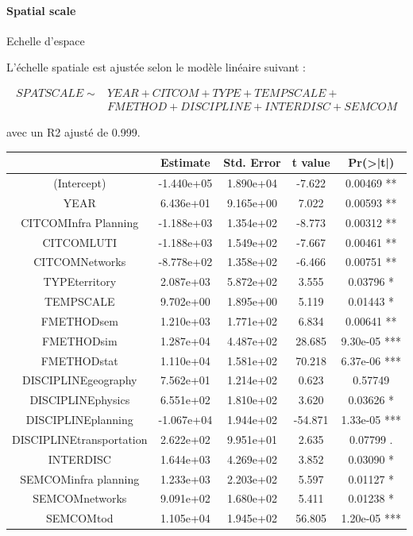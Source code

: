 \paragraph{Spatial scale}{Echelle d'espace}


L'échelle spatiale est ajustée selon le modèle linéaire suivant :

\[
\begin{split}
	SPATSCALE \sim & YEAR+CITCOM+TYPE+TEMPSCALE+ \\
	& FMETHOD+DISCIPLINE+INTERDISC+SEMCOM
\end{split}
\]

avec un R2 ajusté de 0.999.


{\centering
\begin{tabular}{|c|c|c|c|c|}
\hline
                      &     Estimate & Std. Error & t value & Pr(>|t|)    \\\hline
(Intercept)           &   -1.440e+05 & 1.890e+04 & -7.622 & 0.00469 ** \\
YEAR                   &   6.436e+01 & 9.165e+00 &  7.022 & 0.00593 ** \\
CITCOMInfra Planning   &  -1.188e+03 & 1.354e+02 & -8.773 & 0.00312 ** \\
CITCOMLUTI             &  -1.188e+03 & 1.549e+02 & -7.667 & 0.00461 ** \\
CITCOMNetworks         &  -8.778e+02 & 1.358e+02 & -6.466 & 0.00751 ** \\
TYPEterritory          &   2.087e+03 & 5.872e+02 &  3.555 & 0.03796 *  \\
TEMPSCALE              &   9.702e+00 & 1.895e+00 &  5.119 & 0.01443 *  \\
FMETHODsem             &   1.210e+03 & 1.771e+02 &  6.834 & 0.00641 ** \\
FMETHODsim             &   1.287e+04 & 4.487e+02 & 28.685 & 9.30e-05 *** \\
FMETHODstat            &   1.110e+04 & 1.581e+02 & 70.218 & 6.37e-06 ***\\
DISCIPLINEgeography    &   7.562e+01 & 1.214e+02 &  0.623 & 0.57749    \\
DISCIPLINEphysics      &   6.551e+02 & 1.810e+02 &  3.620 & 0.03626 *  \\
DISCIPLINEplanning     &  -1.067e+04 & 1.944e+02 & -54.871 & 1.33e-05 ***\\
DISCIPLINEtransportation &  2.622e+02 & 9.951e+01 &  2.635 & 0.07799 .  \\
INTERDISC              &   1.644e+03 & 4.269e+02  & 3.852 & 0.03090 *  \\
SEMCOMinfra planning   &   1.233e+03 & 2.203e+02  & 5.597 & 0.01127 *  \\
SEMCOMnetworks         &   9.091e+02 & 1.680e+02  & 5.411 & 0.01238 *  \\
SEMCOMtod              &   1.105e+04 & 1.945e+02  & 56.805 & 1.20e-05 ***\\\hline
\end{tabular}
}

